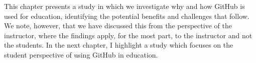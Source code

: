 This chapter presents a study in which we investigate why and how GitHub is used for education, identifying the potential benefits and challenges that follow. We note, however, that we have discussed this from the perspective of the instructor, where the findings apply, for the most part, to the instructor and not the students. In the next chapter, I highlight a study which focuses on the student perspective of using GitHub in education.

